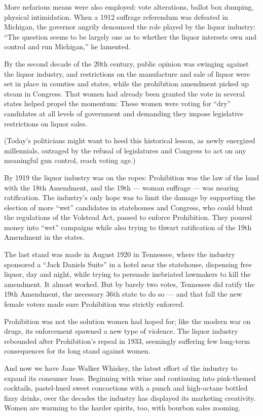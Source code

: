 More nefarious means were also employed: vote alterations, ballot box
dumping, physical intimidation. When a 1912 suffrage referendum was
defeated in Michigan, the governor angrily denounced the role played by
the liquor industry: ``The question seems to be largely one as to
whether the liquor interests own and control and run Michigan,'' he
lamented.

By the second decade of the 20th century, public opinion was swinging
against the liquor industry, and restrictions on the manufacture and
sale of liquor were set in place in counties and states, while the
prohibition amendment picked up steam in Congress. That women had
already been granted the vote in several states helped propel the
momentum: These women were voting for ``dry'' candidates at all levels
of government and demanding they impose legislative restrictions on
liquor sales.

(Today's politicians might want to heed this historical lesson, as newly
energized millennials, outraged by the refusal of legislatures and
Congress to act on any meaningful gun control, reach voting age.)

By 1919 the liquor industry was on the ropes: Prohibition was the law of
the land with the 18th Amendment, and the 19th --- woman suffrage ---
was nearing ratification. The industry's only hope was to limit the
damage by supporting the election of more ``wet'' candidates in
statehouses and Congress, who could blunt the regulations of the
Volstead Act, passed to enforce Prohibition. They poured money into
``wet'' campaigns while also trying to thwart ratification of the 19th
Amendment in the states.

The last stand was made in August 1920 in Tennessee, where the industry
sponsored a ``Jack Daniels Suite'' in a hotel near the statehouse,
dispensing free liquor, day and night, while trying to persuade
inebriated lawmakers to kill the amendment. It almost worked. But by
barely two votes, Tennessee did ratify the 19th Amendment, the necessary
36th state to do so --- and that fall the new female voters made sure
Prohibition was strictly enforced.

Prohibition was not the solution women had hoped for; like the modern
war on drugs, its enforcement spawned a new type of violence. The liquor
industry rebounded after Prohibition's repeal in 1933, seemingly
suffering few long-term consequences for its long stand against women.

And now we have Jane Walker Whiskey, the latest effort of the industry
to expand its consumer base. Beginning with wine and continuing into
pink-themed cocktails, pastel-hued sweet concoctions with a punch and
high-octane bottled fizzy drinks, over the decades the industry has
displayed its marketing creativity. Women are warming to the harder
spirits, too, with bourbon sales zooming.

